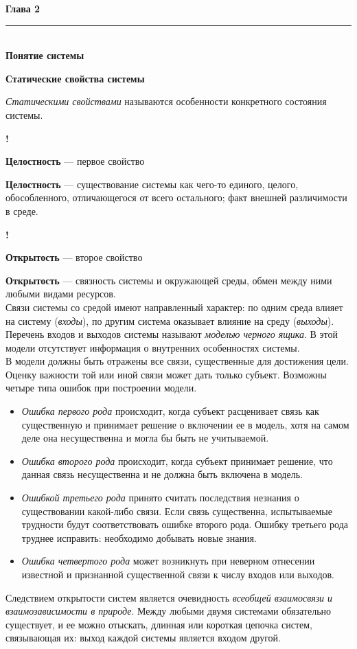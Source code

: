 \documentclass{article}
\newcommand{\note}[1]{\textit{#1}}
\renewcommand{\section}[2]{
	\vspace{6em}
	\begin{flushright}
	\Large
	\baselineskip=0.5\baselineskip
	\textbf{#1}
	\\
	\rule[0.5\baselineskip]{\textwidth}{0.15pt}
	\\
	\textbf{#2}
	\end{flushright}
	}
\renewcommand{\subsection}[1]{
	\vspace{2em}
	\begin{flushright}
		\large
		\textbf{#1}
	\end{flushright}
	}
\newcommand{\define}[2]{
	\textbf{#1} --- #2
	}
\newcommand{\marked}[2]{
	\begin{flushright}\textbf{!}\hspace{2ex}\vline\hspace{2ex}
		\begin{minipage}{0.9\textwidth}
			\define{#1}{#2}
		\end{minipage}
	\end{flushright}
	}
\begin{document}
\section{Глава 2}{Понятие системы}
\subsection{Статические свойства системы}
\note{Статическими свойствами} называются особенности конкретного состояния системы.
\marked{Целостность}{первое свойство}
\define{Целостность}{существование системы как чего-то единого, целого, обособленного, отличающегося от всего остального; факт внешней различимости в среде.}
\marked{Открытость}{второе свойство}
\define{Открытость}{связность системы и окружающей среды, обмен между ними любыми видами ресурсов.}\\
Связи системы со средой имеют направленный характер: по одним среда влияет на систему (\note{входы}), по другим система оказывает влияние на среду (\note{выходы}). Перечень входов и выходов системы называют \note{моделью черного ящика}. В этой модели отсутствует информация о внутренних особенностях системы.\\
В модели должны быть отражены все связи, существенные для достижения цели. Оценку важности той или иной связи может дать только субъект. Возможны четыре типа ошибок при построении модели.
\begin{itemize}
	\item \note{Ошибка первого рода} происходит, когда субъект расценивает связь как существенную и принимает решение о включении ее в модель, хотя на самом деле она несущественна и могла бы быть не учитываемой.
	\item \note{Ошибка второго рода} происходит, когда субъект принимает решение, что данная связь несущественна и не должна быть включена в модель.
	\item \note{Ошибкой третьего рода} принято считать последствия незнания о существовании какой-либо связи. Если связь существенна, испытываемые трудности будут соответствовать ошибке второго рода. Ошибку третьего рода труднее исправить: необходимо добывать новые знания.
	\item \note{Ошибка четвертого рода} может возникнуть при неверном отнесении известной и признанной существенной связи к числу входов или выходов. 
\end{itemize}
Следствием открытости систем является очевидность \note{всеобщей взаимосвязи и взаимозависимости в природе}. Между любыми двумя системами обязательно существует, и ее можно отыскать, длинная или короткая цепочка систем, связывающая их: выход каждой системы является входом другой.
\end{document}
